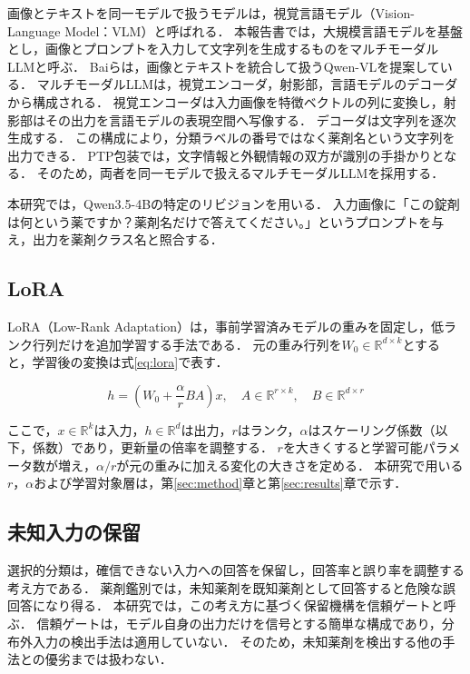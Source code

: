 \documentclass[uplatex,dvipdfmx]{jsarticle}
\begin{document}
画像とテキストを同一モデルで扱うモデルは，視覚言語モデル（Vision-Language Model：VLM）と呼ばれる．
本報告書では，大規模言語モデルを基盤とし，画像とプロンプトを入力して文字列を生成するものをマルチモーダルLLMと呼ぶ．
Baiらは，画像とテキストを統合して扱うQwen-VLを提案している\cite{bai2023qwenvl}．
マルチモーダルLLMは，視覚エンコーダ，射影部，言語モデルのデコーダから構成される．
視覚エンコーダは入力画像を特徴ベクトルの列に変換し，射影部はその出力を言語モデルの表現空間へ写像する．
デコーダは文字列を逐次生成する．
この構成により，分類ラベルの番号ではなく薬剤名という文字列を出力できる．
PTP包装では，文字情報と外観情報の双方が識別の手掛かりとなる．
そのため，両者を同一モデルで扱えるマルチモーダルLLMを採用する．

本研究では，Qwen3.5-4Bの特定のリビジョンを用いる\cite{qwen35model}．
入力画像に「この錠剤は何という薬ですか？薬剤名だけで答えてください。」というプロンプトを与え，出力を薬剤クラス名と照合する．

\subsection{LoRA}

LoRA（Low-Rank Adaptation）は，事前学習済みモデルの重みを固定し，低ランク行列だけを追加学習する手法である\cite{hu2022lora}．
元の重み行列を$W_0 \in \mathbb{R}^{d \times k}$とすると，学習後の変換は式\eqref{eq:lora}で表す．

\begin{equation}
  h = \left(W_0 + \frac{\alpha}{r}BA\right)x,
  \quad
  A \in \mathbb{R}^{r \times k},
  \quad
  B \in \mathbb{R}^{d \times r}
  \label{eq:lora}
\end{equation}

ここで，$x \in \mathbb{R}^{k}$は入力，$h \in \mathbb{R}^{d}$は出力，$r$はランク，$\alpha$はスケーリング係数（以下，係数）であり，更新量の倍率を調整する．
$r$を大きくすると学習可能パラメータ数が増え，$\alpha/r$が元の重みに加える変化の大きさを定める．
本研究で用いる$r$，$\alpha$および学習対象層は，第\ref{sec:method}章と第\ref{sec:results}章で示す．

\subsection{未知入力の保留}

選択的分類は，確信できない入力への回答を保留し，回答率と誤り率を調整する考え方である\cite{geifman2017selective}．
薬剤鑑別では，未知薬剤を既知薬剤として回答すると危険な誤回答になり得る．
本研究では，この考え方に基づく保留機構を信頼ゲートと呼ぶ．
信頼ゲートは，モデル自身の出力だけを信号とする簡単な構成であり，分布外入力の検出手法は適用していない．
そのため，未知薬剤を検出する他の手法との優劣までは扱わない．
\end{document}
